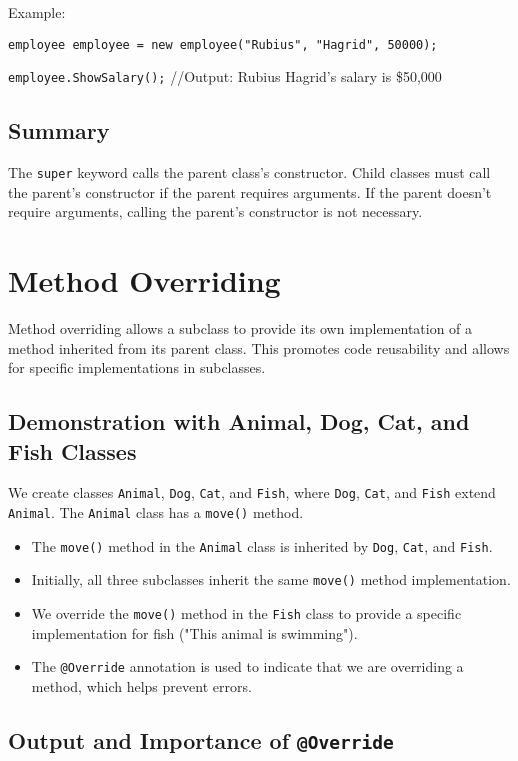 \documentclass{article}
\begin{document}
Example:

\texttt{employee employee = new employee("Rubius", "Hagrid", 50000);}

\texttt{employee.ShowSalary();} //Output: Rubius Hagrid's salary is \$50,000


\subsection{Summary}

The \texttt{super} keyword calls the parent class's constructor.  Child classes must call the parent's constructor if the parent requires arguments.  If the parent doesn't require arguments, calling the parent's constructor is not necessary.


\section{Method Overriding}

Method overriding allows a subclass to provide its own implementation of a method inherited from its parent class. This promotes code reusability and allows for specific implementations in subclasses.

\subsection{Demonstration with Animal, Dog, Cat, and Fish Classes}

We create classes \texttt{Animal}, \texttt{Dog}, \texttt{Cat}, and \texttt{Fish}, where \texttt{Dog}, \texttt{Cat}, and \texttt{Fish} extend \texttt{Animal}. The \texttt{Animal} class has a \texttt{move()} method.

\begin{itemize}
    \item  The \texttt{move()} method in the \texttt{Animal} class is inherited by \texttt{Dog}, \texttt{Cat}, and \texttt{Fish}.
    \item Initially, all three subclasses inherit the same \texttt{move()} method implementation.
    \item We override the \texttt{move()} method in the \texttt{Fish} class to provide a specific implementation for fish ("This animal is swimming").
    \item The \texttt{@Override} annotation is used to indicate that we are overriding a method, which helps prevent errors.
\end{itemize}


\subsection{Output and Importance of \texttt{@Override}}
\end{document}
